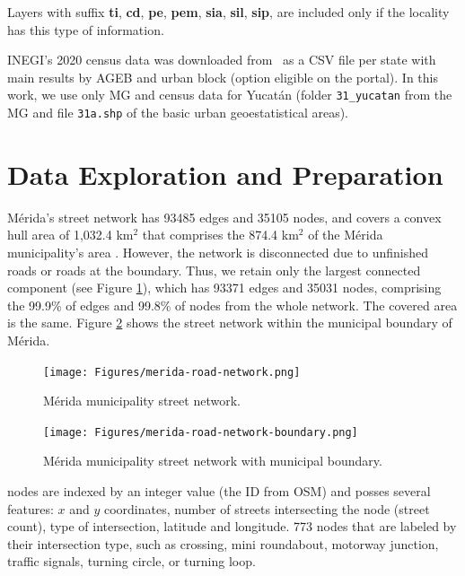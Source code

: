 Layers with suffix \textbf{ti}, \textbf{cd}, \textbf{pe}, \textbf{pem}, \textbf{sia}, \textbf{sil}, \textbf{sip}, are included only if the locality has this type of information.

INEGI's 2020 census data was downloaded from~\cite{2020census} as a CSV file per state with main results by AGEB and urban block (option eligible on the portal). In this work, we use only MG and census data for Yucatán (folder \verb|31_yucatan| from the MG and file \verb|31a.shp| of the basic urban geoestatistical areas).

\section{Data Exploration and Preparation}

Mérida's street network has 93485 edges and 35105 nodes, and covers a convex hull area of 1,032.4 km$^2$ that comprises the 874.4 km$^2$ of the Mérida municipality's area \cite{2020census}. However, the network is disconnected due to unfinished roads or roads at the boundary. Thus, we retain only the largest connected component (see Figure \ref{fig:merida-street-network}), which has 93371 edges and 35031 nodes, comprising the 99.9\% of edges and 99.8\% of nodes from the whole network. The covered area is the same. Figure \ref{fig:merida-street-network-boundary} shows the street network within the municipal boundary of Mérida.

\begin{figure}[htpb]
  \centering
  \texttt{[image: Figures/merida-road-network.png]}
  \caption{Mérida municipality street network.
    \label{fig:merida-street-network}}
\end{figure}

\begin{figure}[htpb]
  \centering
  \texttt{[image: Figures/merida-road-network-boundary.png]}
  \caption{Mérida municipality street network with municipal boundary.
    \label{fig:merida-street-network-boundary}}
\end{figure}

 nodes are indexed by an integer value (the ID from OSM) and posses several features: $x$ and $y$ coordinates, number of streets intersecting the node (street count), type of intersection, latitude and longitude.  773 nodes that are labeled by their intersection type, such as crossing, mini roundabout, motorway junction, traffic signals, turning circle, or turning loop. 

